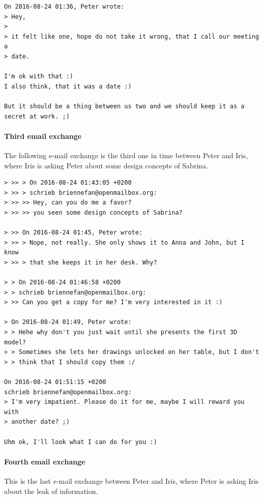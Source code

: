 \documentclass[12pt]{article}
\begin{document}
\begin{shaded}
\begin{verbatim}
On 2016-08-24 01:36, Peter wrote:
> Hey,
> 
> it felt like one, hope do not take it wrong, that I call our meeting a
> date.

I'm ok with that :)
I also think, that it was a date :)

But it should be a thing between us two and we should keep it as a 
secret at work. ;)
\end{verbatim}
\end{shaded}

\paragraph{Third email exchange}
The following e-mail exchange is the third one in time between Peter and Iris, where Iris is asking Peter about some design concepts of Sabrina.

\begin{shaded}
\begin{verbatim}
> >> > On 2016-08-24 01:43:05 +0200
> >> > schrieb briennefan@openmailbox.org:
> >> >> Hey, can you do me a favor?
> >> >> you seen some design concepts of Sabrina?

> >> On 2016-08-24 01:45, Peter wrote:
> >> > Nope, not really. She only shows it to Anna and John, but I know
> >> > that she keeps it in her desk. Why?

> > On 2016-08-24 01:46:58 +0200
> > schrieb briennefan@openmailbox.org:
> >> Can you get a copy for me? I'm very interested in it :)

> On 2016-08-24 01:49, Peter wrote:
> > Hehe why don't you just wait until she presents the first 3D model?
> > Sometimes she lets her drawings unlocked on her table, but I don't
> > think that I should copy them :/

On 2016-08-24 01:51:15 +0200
schrieb briennefan@openmailbox.org:
> I'm very impatient. Please do it for me, maybe I will reward you with 
> another date? ;)

Uhm ok, I'll look what I can do for you :)
\end{verbatim}
\end{shaded}

\paragraph{Fourth email exchange}
This is the last e-mail exchange between Peter and Iris, where Peter is asking Iris about the leak of information.
\end{document}
